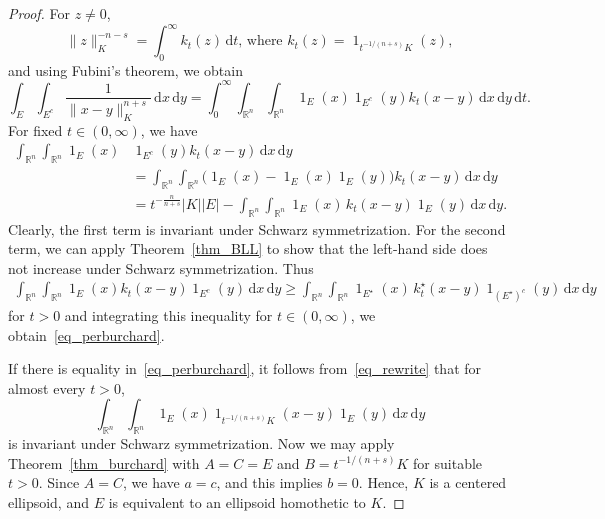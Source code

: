 \documentclass{amsart}
\newcommand{\dvtex}{\,\mathrm{d}}
\newcommand{\vol}[1]{ \vert #1\vert}
\renewcommand{\chi}{\operatorname{1}}
\begin{document}
\begin{proof}
For $z\ne 0$,
%
\begin{equation*}
\|z\|_{K}^{-n-s} = \int _{0}^{\infty }k_{t}(z) \dvtex t \text{, where } k_{t}(z)
= \chi _{t^{- 1/({n+s})}K}(z),
\end{equation*}
%
and using Fubini's theorem, we obtain
%
\begin{equation*}
\int _{E}\int _{E^{c}} \frac{1}{\|x-y\|^{n+s}_{K}} \dvtex x \dvtex y = \int _{0}^{
\infty }\int _{\mathbb R^{n}}\int _{\mathbb R^{n}} \chi _{E}(x) \chi _{E^{c}}(y)
k_{t}(x-y) \dvtex x \dvtex y \dvtex t.
\end{equation*}
%
For fixed $t \in (0,\infty )$, we have
%
\begin{align}
\int _{\mathbb R^{n}}\int _{\mathbb R^{n}} \chi _{E}(x) &\chi _{E^{c}}(y)
k_{t}(x-y) \dvtex x \dvtex y
\nonumber \\
&= \int _{\mathbb R^{n}}\int _{\mathbb R^{n}} \big( \chi _{E}(x)-
\chi _{E}(x) \chi _{E}(y) \big)k_{t}(x-y) \dvtex x \dvtex y
\label{eq_rewrite}
\\
&= t^{-\frac {n}{n+s}} \vol{K} \vol{E} - \int _{\mathbb R^{n}}\int _{
\mathbb R^{n}}\chi _{E}(x)\, k_{t}(x-y) \chi _{E}(y) \dvtex x \dvtex y.
\nonumber \end{align}
%
Clearly, the first term is invariant under Schwarz symmetrization. For
the second term, we can apply Theorem~\ref{thm_BLL} to show that the left-hand
side does not increase under Schwarz symmetrization. Thus
%
\begin{multline}
\int _{\mathbb R^{n}}\int _{\mathbb R^{n}} \chi _{E}(x) k_{t}(x-y)
\chi _{E^{c}}(y) \dvtex x \dvtex y
\ge \int _{\mathbb R^{n}}\int _{\mathbb R^{n}} \chi _{E^{\star}}(x)\, k^{
\star}_{t}(x-y) \chi _{(E^{\star})^{c}}(y) \dvtex x \dvtex y
\nonumber \end{multline}
%
for $t>0$ and integrating this inequality for $t\in (0,\infty )$, we obtain~\eqref{eq_perburchard}.

If there is equality in~\eqref{eq_perburchard}, it follows from~\eqref{eq_rewrite} that for almost every $t>0$,
%
\begin{equation*}
\int _{\mathbb R^{n}}\int _{\mathbb R^{n}} \chi _{E}(x) \chi _{t^{-1/(n+s)}K}(x-y)
\chi _{E}(y) \dvtex x \dvtex y
\end{equation*}
%
is invariant under Schwarz symmetrization. Now we may apply Theorem~\ref{thm_burchard} with $A = C = E$ and $B = t^{- 1/({n+s})} K$ for suitable
$t>0$. Since $A=C$, we have $a=c$, and this implies $b=0$. Hence,
$K$ is a centered ellipsoid, and $E$ is equivalent to an ellipsoid homothetic
to $K$.
\end{proof}
\end{document}
